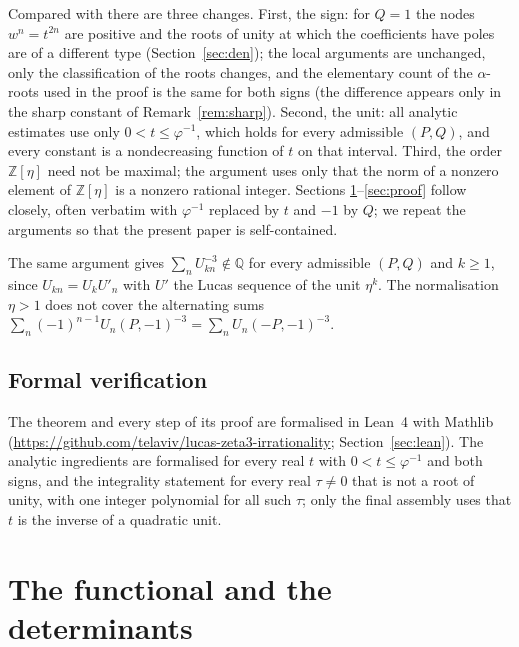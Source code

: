\documentclass[11pt]{amsart}
\theoremstyle{definition}
\theoremstyle{remark}
\numberwithin{equation}{section}
\newcommand{\ZZ}{\mathbb{Z}}
\newcommand{\QQ}{\mathbb{Q}}
\begin{document}
Compared with \cite{Kri26} there are three changes. First, the sign: for $Q=1$ the nodes $w^n=t^{2n}$ are positive and the
roots of unity at which the coefficients have poles are of a different type (Section~\ref{sec:den}); the local
arguments are unchanged, only the classification of the roots changes, and the elementary count of the $\alpha$-roots
used in the proof is the same for both signs (the difference appears only in the sharp constant of
Remark~\ref{rem:sharp}). Second,
the unit: all analytic estimates use only $0<t\le\varphi^{-1}$, which holds for every admissible $(P,Q)$, and every
constant is a nondecreasing function of $t$ on that interval. Third, the order $\ZZ[\eta]$ need not be maximal; the
argument uses only that the norm of a nonzero element of $\ZZ[\eta]$ is a nonzero rational integer. Sections
\ref{sec:setup}--\ref{sec:proof} follow \cite{Kri26} closely, often verbatim with $\varphi^{-1}$ replaced by $t$ and
$-1$ by $Q$; we repeat the arguments so that the present paper is self-contained.

The same argument gives $\sum_nU_{kn}^{-3}\notin\QQ$ for every admissible $(P,Q)$ and $k\ge1$, since
$U_{kn}=U_kU'_n$ with $U'$ the Lucas sequence of the unit $\eta^k$. The normalisation $\eta>1$ does not cover the
alternating sums $\sum_n(-1)^{n-1}U_n(P,-1)^{-3}=\sum_nU_n(-P,-1)^{-3}$.

\subsection*{Formal verification}
The theorem and every step of its proof are formalised in Lean~4 with Mathlib
(\url{https://github.com/telaviv/lucas-zeta3-irrationality}; Section~\ref{sec:lean}). The analytic
ingredients are formalised for every real $t$ with $0<t\le\varphi^{-1}$ and both signs, and the integrality statement
for every real $\tau\ne0$ that is not a root of unity, with one integer polynomial for all such $\tau$; only the final
assembly uses that $t$ is the inverse of a quadratic unit.

\section{The functional and the determinants}\label{sec:setup}
\end{document}
